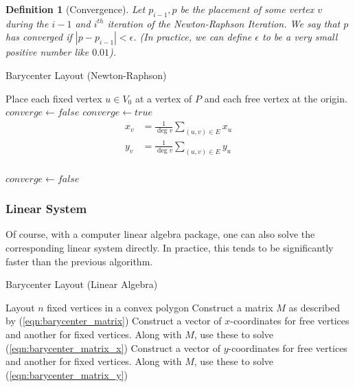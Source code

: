\documentclass[11pt]{report}
\newcommand{\abs}[1]{\left|#1\right|}
\newtheorem{defn}{Definition}[section]
\begin{document}
\begin{defn}[Convergence]
    Let $p_{i - 1}, p$ be the placement of some vertex $v$ during the $i - 1$ and $i^{th}$ iteration of the Newton-Raphson Iteration. We say that $p$ has converged if $\abs{p - p_{i - 1}} < \epsilon$. (In practice, we can define $\epsilon$ to be a very small positive number like $0.01$).
\end{defn}

\begin{algorithm}[H]
    \caption{Barycenter Layout (Newton-Raphson)}
    \begin{algorithmic}[1]
        \State Place each fixed vertex $u \in V_0$ at a vertex of $P$ and each free vertex at the origin.
        \State $converge \gets false$
            \State $converge \gets true$
                \[
                \begin{aligned}
                x_v &= \frac{1}{\deg{v}} \sum_{(u, v) \in E} x_u \\
                y_v &= \frac{1}{\deg{v}} \sum_{(u, v) \in E} y_u \\
                \end{aligned}
                \]
                
                \State {}
                    \State $converge \gets false$
                \EndIf
            \EndFor
        \EndWhile
        \EndProcedure
    \end{algorithmic}
\end{algorithm}

\subsubsection{Linear System}
Of course, with a computer linear algebra package, one can also solve the corresponding linear system directly. In practice, this tends to be significantly faster than the previous algorithm.

\begin{algorithm}[H]
    \caption{Barycenter Layout (Linear Algebra)}\label{barycenter_la}
    \begin{algorithmic}[1]       
        \State Layout $n$ fixed vertices in a convex polygon
        \State Construct a matrix $M$ as described by (\ref{eqn:barycenter_matrix})
        \State Construct a vector of $x$-coordinates for free vertices and another for fixed vertices. Along with $M$, use these to solve (\ref{eqn:barycenter_matrix_x})
        \State Construct a vector of $y$-coordinates for free vertices and another for fixed vertices. Along with $M$, use these to solve (\ref{eqn:barycenter_matrix_y})
        \EndProcedure
    \end{algorithmic}
\end{algorithm}
\end{document}
